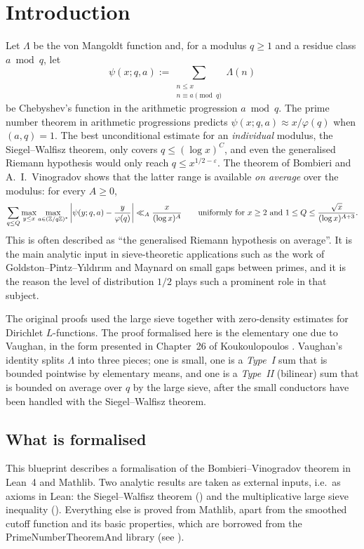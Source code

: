 \chapter{Introduction}\label{ch:intro}

Let $\Lambda$ be the von Mangoldt function and, for a modulus $q \ge 1$ and a residue class
$a \bmod q$, let
$$\psi(x; q, a) := \sum_{\substack{n \le x \\ n \equiv a \pmod q}} \Lambda(n)$$
be Chebyshev's function in the arithmetic progression $a \bmod q$. The prime number theorem in
arithmetic progressions predicts $\psi(x; q, a) \approx x/\varphi(q)$ when $(a, q) = 1$. The best
unconditional estimate for an \emph{individual} modulus, the Siegel--Walfisz theorem,
only covers $q \le (\log x)^C$, and even the generalised Riemann
hypothesis would only reach $q \le x^{1/2 - \varepsilon}$. The theorem of Bombieri
and A.~I.~Vinogradov shows that the latter range is available \emph{on average}
over the modulus: for every $A \ge 0$,
$$\sum_{q \le Q} \max_{y \le x} \max_{a \in (\mathbb{Z}/q\mathbb{Z})^*} \left| \psi(y; q, a) - \frac{y}{\varphi(q)} \right| \ll_A \frac{x}{(\log x)^A}
\qquad \text{uniformly for } x \ge 2 \text{ and } 1 \le Q \le \frac{\sqrt x}{(\log x)^{A+3}} .$$
This is often described as ``the generalised Riemann hypothesis on average''. It is the main
analytic input in sieve-theoretic applications such as the work of Goldston--Pintz--Y\i ld\i r\i m and
Maynard on small gaps between primes, and it is the reason the level of distribution $1/2$ plays such a
prominent role in that subject.

The original proofs used the large sieve together with zero-density estimates for Dirichlet
$L$-functions. The proof formalised here is the elementary one due to Vaughan,
in the form presented in Chapter~26 of Koukoulopoulos
\cite{Koukoulopoulos2019}.
Vaughan's identity splits $\Lambda$ into three pieces; one is small, one is a \emph{Type~I} sum that
is bounded pointwise by elementary means, and one is a \emph{Type~II} (bilinear) sum that is bounded
on average over $q$ by the large sieve, after the small conductors have been handled with the
Siegel--Walfisz theorem.

\section*{What is formalised}

This blueprint describes a formalisation of the Bombieri--Vinogradov theorem in Lean~4 and Mathlib.
Two analytic results are taken as external inputs, i.e.\ as axioms in Lean: the Siegel--Walfisz
theorem () and the multiplicative large sieve inequality
(). Everything else is proved from Mathlib, apart from the smoothed cutoff
function and its basic properties, which are borrowed from the PrimeNumberTheoremAnd library
\cite{PNTplus} (see ).

